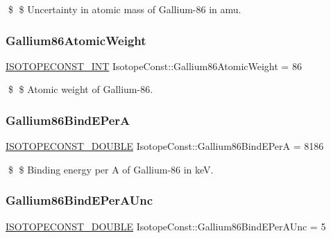 \$ \$ Uncertainty in atomic mass of Gallium-\/86 in amu. \mbox{\label{group___isotope_const-_gallium-_ga86_ga75003b0bea13c4e12174959b0eadc627}} 
\subsubsection{\texorpdfstring{Gallium86\+Atomic\+Weight}{Gallium86AtomicWeight}}
{\footnotesize\ttfamily \mbox{\hyperlink{group___isotope_const-_macros_ga5f18360b3e99483a35c32d789e62621c}{I\+S\+O\+T\+O\+P\+E\+C\+O\+N\+S\+T\+\_\+\+I\+NT}} Isotope\+Const\+::\+Gallium86\+Atomic\+Weight = 86}

\$ \$ Atomic weight of Gallium-\/86. \mbox{\label{group___isotope_const-_gallium-_ga86_ga0052556cb54196c258099a355d12dede}} 
\subsubsection{\texorpdfstring{Gallium86\+Bind\+E\+PerA}{Gallium86BindEPerA}}
{\footnotesize\ttfamily \mbox{\hyperlink{group___isotope_const-_macros_ga8f45a7272ce02c0b4c65c44636ed719a}{I\+S\+O\+T\+O\+P\+E\+C\+O\+N\+S\+T\+\_\+\+D\+O\+U\+B\+LE}} Isotope\+Const\+::\+Gallium86\+Bind\+E\+PerA = 8186}

\$ \$ Binding energy per A of Gallium-\/86 in keV. \mbox{\label{group___isotope_const-_gallium-_ga86_ga633e248f4ce3ee984cf7793f434195b5}} 
\subsubsection{\texorpdfstring{Gallium86\+Bind\+E\+Per\+A\+Unc}{Gallium86BindEPerAUnc}}
{\footnotesize\ttfamily \mbox{\hyperlink{group___isotope_const-_macros_ga8f45a7272ce02c0b4c65c44636ed719a}{I\+S\+O\+T\+O\+P\+E\+C\+O\+N\+S\+T\+\_\+\+D\+O\+U\+B\+LE}} Isotope\+Const\+::\+Gallium86\+Bind\+E\+Per\+A\+Unc = 5}

